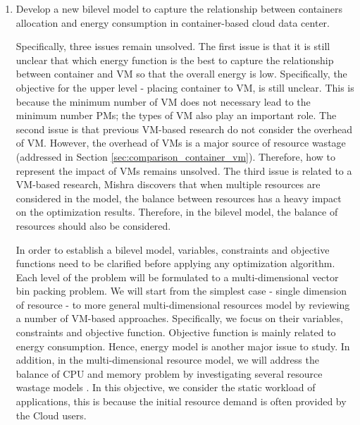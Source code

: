 \begin{enumerate}
	\item Develop a new bilevel model to capture the relationship between containers allocation and energy consumption in container-based cloud data center.

	 Specifically, three issues remain unsolved. 
	The first issue is that it is still unclear that which energy function is the best to capture the relationship between container and VM so that the overall energy is low. Specifically, the objective for the upper level - placing container to VM, is still unclear. This is because the minimum number of VM does not necessary lead to the minimum number PMs; the types of VM also play an important role.
	The second issue is that previous VM-based research do not consider the overhead of VM. However, the overhead of VMs is a major source of resource wastage (addressed in Section \ref{sec:comparison_container_vm}). Therefore, how to represent the impact of VMs remains unsolved.
	The third issue is related to a VM-based research,  Mishra \cite{Mishra:2011bz} discovers that when multiple resources are considered in the model, the balance between resources has a heavy impact on the optimization results. Therefore, in the bilevel model, the balance of resources should also be considered.

	In order to establish a bilevel model, variables, constraints and objective functions need to be clarified before applying any optimization algorithm. Each level of the problem will be formulated to a multi-dimensional vector bin packing problem. 
	We will start from the simplest case - single dimension of resource - to more general multi-dimensional resources model by reviewing a number of VM-based approaches. Specifically, we focus on their variables, constraints and objective function. Objective function is mainly related to energy consumption. Hence, energy model is another major issue to study. In addition, in the multi-dimensional resource model, we will address the balance of CPU and memory problem by investigating several resource wastage models \cite{Ferdaus:2014ep, Xu:2010vh, Gao:2013gg}. In this objective, we consider the static workload of applications, this is because the initial resource demand is often provided by the Cloud users.


\end{enumerate}
